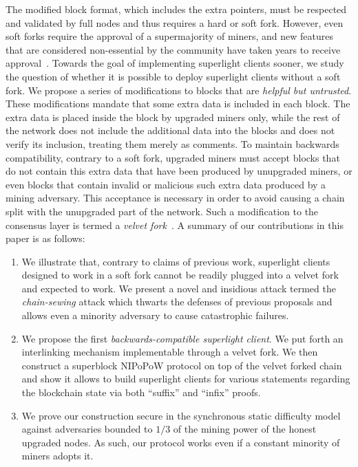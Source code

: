 The modified block format, which includes the extra pointers, must be respected
and validated by full nodes and thus requires a hard or soft fork. However, even soft forks require the approval of a supermajority of
miners, and new features that are considered non-essential by the community have
taken years to receive approval~\cite{segwit}. Towards the goal of implementing
superlight clients sooner, we study the question of whether it is possible to
deploy superlight clients without a soft fork. We propose a series of
modifications to blocks that are \emph{helpful but untrusted}. These
modifications mandate that some extra data is included in each block. The extra
data is placed inside the block by upgraded miners only, while the rest of the
network does not include the additional data into the blocks and does not verify
its inclusion, treating them merely as comments. To maintain backwards
compatibility, contrary to a soft fork, upgraded miners must accept blocks that
do not contain this extra data that have been produced by unupgraded miners, or
even blocks that contain invalid or malicious such extra data produced by a
mining adversary. This acceptance is necessary in order to avoid causing a chain
split with the unupgraded part of the network. Such a modification to the
consensus layer is termed a \emph{velvet fork}~\cite{velvet}.
A summary of our contributions in this paper is as follows:
\begin{enumerate}
  \item We illustrate that, contrary to claims of previous work, superlight
        clients designed to work in a soft fork cannot be readily plugged into a velvet fork and expected to work. We present a novel and insidious
        attack termed the \emph{chain-sewing} attack which thwarts the defenses of previous proposals and allows even a minority adversary to cause
        catastrophic failures.
  \item We propose the first \emph{backwards-compatible superlight client}. We put forth an interlinking mechanism implementable through a velvet fork. We then construct a superblock NIPoPoW protocol on top of the velvet forked chain and show it allows to build superlight clients for various statements regarding the blockchain state via both ``suffix'' and ``infix'' proofs.
  \item We prove our construction secure in the synchronous static difficulty model against adversaries bounded to $1/3$ of the mining power of the honest upgraded nodes. As such, our protocol works even if a constant minority of miners adopts it.
\end{enumerate}

